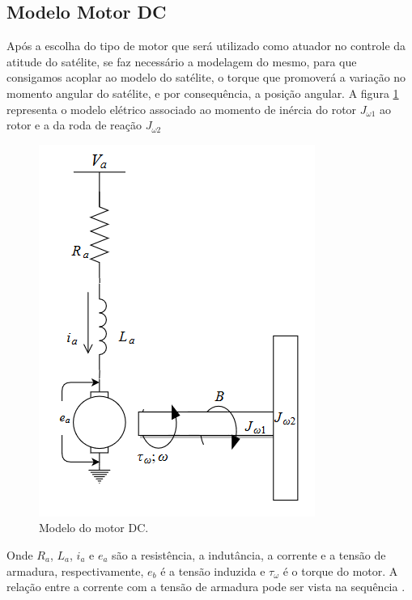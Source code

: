 \subsection{Modelo Motor DC}

Após a escolha do tipo de motor que será utilizado como atuador no controle da atitude do satélite, se faz necessário a modelagem do mesmo, para que consigamos acoplar ao modelo do satélite, o torque que promoverá a variação no momento angular do satélite, e por consequência, a posição angular. A figura \ref{fig:modelo_motor_dc} representa o modelo elétrico associado ao momento de inércia do rotor $J_{\omega 1}$ ao rotor e a da roda de reação $J_{\omega 2}$

\begin{figure}[H]
  \caption{Modelo do motor DC.}
  \begin{center}
      \includegraphics[scale=.7]{metodologia/img/modelo_motor_dc}
  \end{center}
  \label{fig:modelo_motor_dc}
\end{figure}

Onde $R_a$, $L_a$, $i_a$ e $e_a$ são a resistência, a indutância, a corrente e a tensão de armadura, respectivamente, $e_b$ é a tensão induzida e $\tau_{\omega}$ é o torque do motor. A relação entre a corrente com a tensão de armadura pode ser vista na sequência \cite{Ogata}.

